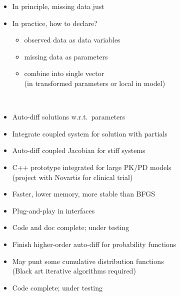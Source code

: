 \documentclass[10pt]{report}
\newcommand{\sld}[1]{\newpage{\noindent\LARGE \ \ \
    \textcolor{MidnightBlue}{\bfseries #1}}\vspace*{4pt}}
\newcommand{\spc}{\hspace*{0.25in}}
\newcommand{\myemph}[1]{{\color{MidnightBlue}{\bfseries #1}}}
\newcommand{\mypart}[2]{{\newpage 
\mbox{ }
\vfill
\noindent\spc\color{MidnightBlue}{\LARGE\bfseries #1\\[10pt]\spc\Huge{#2}}
\vfill\vfill}
\mbox{ }}
\begin{document}
\sld{Models with Missing Data}
\begin{itemize}
\item In principle, missing data just \myemph{additional parameters}
\item In practice, how to declare? 
\vspace*{-3pt}
\begin{itemize}\small
\item observed data as data variables
\item missing data as parameters
\item combine into single vector 
\\ {\footnotesize (in transformed parameters or local in model)}
\end{itemize}
\end{itemize}

\mypart{Part III}{What's Next?}

\sld{Differential Equation Solver}
\begin{itemize}
\item Auto-diff solutions w.r.t.\ parameters
\item Integrate coupled system for solution with partials
\item Auto-diff coupled Jacobian for stiff systems
\vfill
\item C++ prototype integrated for large PK/PD models
\\ {\footnotesize (project with Novartis for clinical trial)}
\end{itemize}

\sld{L-BFGS Optimizer}
\begin{itemize}
\item Faster, lower memory, more stable than BFGS
\item Plug-and-play in interfaces
\vfill
\item Code and doc complete; under testing
\end{itemize}

\sld{Higher-Order Auto-diff}
\begin{itemize}
\item Finish higher-order auto-diff for probability functions
\item May punt some cumulative distribution functions
\\
{\footnotesize (Black art iterative algorithms required)}
\vfill
\item Code complete; under testing
\end{itemize}
\end{document}
